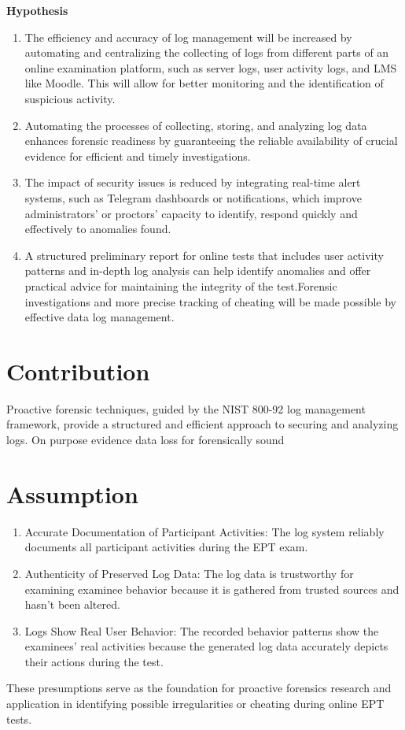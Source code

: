 \textbf{Hypothesis}

\begin{enumerate}
    \item The efficiency and accuracy of log management will be increased by automating and centralizing the collecting of logs from different parts of an online examination platform, such as server logs, user activity logs, and LMS like Moodle. This will allow for better monitoring and the identification of suspicious activity.
    \item Automating the processes of collecting, storing, and analyzing log data enhances forensic readiness by guaranteeing the reliable availability of crucial evidence for efficient and timely investigations.
    \item The impact of security issues is reduced by integrating real-time alert systems, such as Telegram dashboards or notifications, which improve administrators' or proctors' capacity to identify, respond quickly and effectively to anomalies found.
    \item A structured preliminary report for online tests that includes user activity patterns and in-depth log analysis can help identify anomalies and offer practical advice for maintaining the integrity of the test.Forensic investigations and more precise tracking of cheating will be made possible by effective data log management.
\end{enumerate}


\section{Contribution}
Proactive forensic techniques, guided by the NIST 800-92 log management framework, provide a structured and efficient approach to securing and analyzing logs. On purpose evidence data loss for forensically sound
\section{Assumption}


\begin{enumerate}
    \item Accurate Documentation of Participant Activities: The log system reliably documents all participant activities during the EPT exam.
    \item Authenticity of Preserved Log Data: The log data is trustworthy for examining examinee behavior because it is gathered from trusted sources and hasn't been altered.
    \item Logs Show Real User Behavior: The recorded behavior patterns show the examinees' real activities because the generated log data accurately depicts their actions during the test.
\end{enumerate}
These presumptions serve as the foundation for proactive forensics research and application in identifying possible irregularities or cheating during online EPT tests.
    

